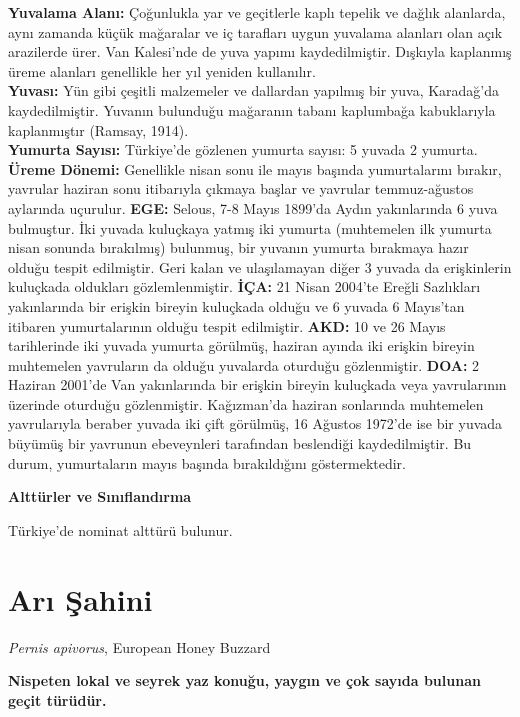 \documentclass[
  a4paper,
  DIV=11,
  numbers=noendperiod]{scrreprt}
\begin{document}
\textbf{Yuvalama Alanı:} Çoğunlukla yar ve geçitlerle kaplı tepelik ve
dağlık alanlarda, aynı zamanda küçük mağaralar ve iç tarafları uygun
yuvalama alanları olan açık arazilerde ürer. Van Kalesi'nde de yuva
yapımı kaydedilmiştir. Dışkıyla kaplanmış üreme alanları genellikle her
yıl yeniden kullanılır.\\
\textbf{Yuvası:} Yün gibi çeşitli malzemeler ve dallardan yapılmış bir
yuva, Karadağ'da kaydedilmiştir. Yuvanın bulunduğu mağaranın tabanı
kaplumbağa kabuklarıyla kaplanmıştır (Ramsay, 1914).\\
\textbf{Yumurta Sayısı:} Türkiye'de gözlenen yumurta sayısı: 5 yuvada 2
yumurta.\\
\textbf{Üreme Dönemi:} Genellikle nisan sonu ile mayıs başında
yumurtalarını bırakır, yavrular haziran sonu itibarıyla çıkmaya başlar
ve yavrular temmuz-ağustos aylarında uçurulur. \textbf{EGE:} Selous, 7-8
Mayıs 1899'da Aydın yakınlarında 6 yuva bulmuştur. İki yuvada kuluçkaya
yatmış iki yumurta (muhtemelen ilk yumurta nisan sonunda bırakılmış)
bulunmuş, bir yuvanın yumurta bırakmaya hazır olduğu tespit edilmiştir.
Geri kalan ve ulaşılamayan diğer 3 yuvada da erişkinlerin kuluçkada
oldukları gözlemlenmiştir. \textbf{İÇA:} 21 Nisan 2004'te Ereğli
Sazlıkları yakınlarında bir erişkin bireyin kuluçkada olduğu ve 6 yuvada
6 Mayıs'tan itibaren yumurtalarının olduğu tespit edilmiştir.
\textbf{AKD:} 10 ve 26 Mayıs tarihlerinde iki yuvada yumurta görülmüş,
haziran ayında iki erişkin bireyin muhtemelen yavruların da olduğu
yuvalarda oturduğu gözlenmiştir. \textbf{DOA:} 2 Haziran 2001'de Van
yakınlarında bir erişkin bireyin kuluçkada veya yavrularının üzerinde
oturduğu gözlenmiştir. Kağızman'da haziran sonlarında muhtemelen
yavrularıyla beraber yuvada iki çift görülmüş, 16 Ağustos 1972'de ise
bir yuvada büyümüş bir yavrunun ebeveynleri tarafından beslendiği
kaydedilmiştir. Bu durum, yumurtaların mayıs başında bırakıldığını
göstermektedir.

\textbf{Alttürler ve Sınıflandırma}

Türkiye'de nominat alttürü bulunur.

\section{Arı Şahini}\label{arux131-ux15fahini}

\emph{Pernis apivorus}, European Honey Buzzard

\textbf{Nispeten lokal ve seyrek yaz konuğu, yaygın ve çok sayıda
bulunan geçit türüdür.}
\end{document}
